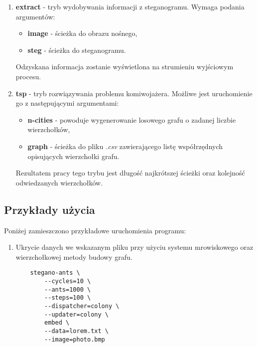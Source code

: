 {{{\begin{enumerate}
                \item \textbf{extract} - tryb wydobywania informacji z steganogramu. Wymaga podania argumentów:
                    \begin{itemize}
                        \item \textbf{image} - ścieżka do obrazu nośnego,
                        \item \textbf{steg} - ścieżka do steganogramu.
                    \end{itemize}

                    Odzyskana informacja zostanie wyświetlona na strumieniu wyjściowym procesu.

                \item \textbf{tsp} - tryb rozwiązywania problemu komiwojażera. Możliwe jest uruchomienie go z
                następującymi argumentami:
                    \begin{itemize}
                        \item \textbf{n-cities} - powoduje wygenerowanie losowego grafu o zadanej liczbie wierzchołków,
                        \item \textbf{graph} - ścieżka do pliku \textit{.csv} zawierającego listę współrzędnych
                        opisujących wierzchołki grafu.
                    \end{itemize}

                    Rezultatem pracy tego trybu jest długość najkrótszej ścieżki oraz kolejność odwiedzanych wierzchołków.
            \end{enumerate}
        }

        \subsection{Przykłady użycia}
        {
            Poniżej zamieszczono przykładowe uruchomienia programu:

            \begin{enumerate}
                \item Ukrycie danych we wskazanym pliku przy użyciu systemu mrowiskowego oraz wierzchołkowej metody
                budowy grafu.

                \begin{lstlisting}
    stegano-ants \
        --cycles=10 \
        --ants=1000 \
        --steps=100 \
        --dispatcher=colony \
        --updater=colony \
        embed \
        --data=lorem.txt \
        --image=photo.bmp
                \end{lstlisting}


\end{enumerate}}}}
